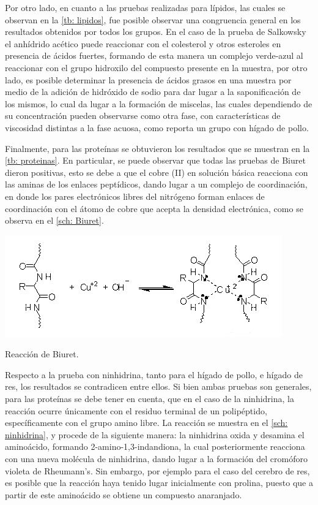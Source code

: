 \documentclass[fleqn,10pt]{SelfArx}
\begin{document}
	Por otro lado, en cuanto a las pruebas realizadas para lípidos, las cuales se observan en la \autoref{tb: lipidos}, fue posible observar una congruencia general en los resultados obtenidos por todos los grupos. En el caso de la prueba de Salkowsky el anhídrido acético puede reaccionar con el colesterol y otros esteroles en presencia de ácidos fuertes, formando de esta manera un complejo verde-azul al reaccionar con el grupo hidroxilo del compuesto presente en la muestra, por otro lado, es posible determinar la presencia de \'acidos grasos en una muestra por medio de la adición de hidróxido de sodio para dar lugar a la saponificaci\'on de los mismos, lo cual da lugar a la formaci\'on de miscelas, las cuales dependiendo de su concentraci\'on pueden observarse como otra fase, con caracter\'isticas de viscosidad distintas a la fase acuosa, como reporta un grupo con h\'igado de pollo.
	
	
	
	Finalmente, para las prote\'inas se obtuvieron los resultados que se muestran en la \autoref{tb: proteinas}. En particular, se puede observar que todas las pruebas de Biuret dieron positivas, esto se debe a que el cobre (II) en soluci\'on b\'asica reacciona con las aminas de los enlaces pept\'idicos, dando lugar a un complejo de coordinaci\'on, en donde los pares electr\'onicos libres del nitr\'ogeno forman enlaces de coordinaci\'on con el \'atomo de cobre que acepta la densidad electr\'onica, como se observa en el \autoref{sch: Biuret}. 
	
	\begin{scheme}[h]
		\centering
		\includegraphics[width=\linewidth]{Biuret}
		\caption{Reacci\'on de Biuret.}
		\label{sch: Biuret}
	\end{scheme}

	Respecto a la prueba con ninhidrina, tanto para el h\'igado de pollo, e h\'igado de res, los resultados se contradicen entre ellos. Si bien ambas pruebas son generales, para las prote\'inas se debe tener en cuenta, que en el caso de la ninhidrina, la reacci\'on ocurre \'unicamente con el residuo terminal de un polip\'eptido, espec\'ificamente con el grupo amino libre. La reacci\'on se muestra en el \autoref{sch: ninhidrina}, y procede de la siguiente manera: la ninhidrina oxida y desamina el amino\'acido, formando 2-amino-1,3-indandiona, la cual posteriormente reacciona con una nueva mol\'ecula de ninhidrina, dando lugar a la formaci\'on del crom\'oforo violeta de Rheumann's. Sin embargo, por ejemplo para el caso del cerebro de res, es posible que la reacci\'on haya tenido lugar inicialmente con prolina, puesto que a partir de este amino\'acido se obtiene un compuesto anaranjado.
	
\end{document}
